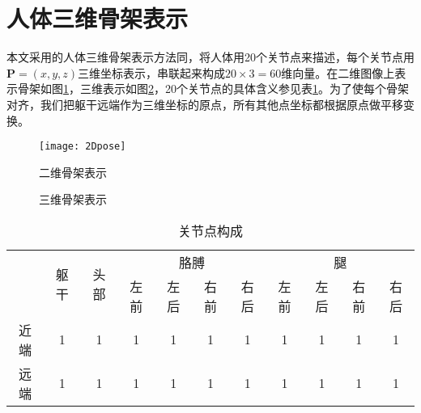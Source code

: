 \section{人体三维骨架表示}
\label{sec:skeleton}

本文采用的人体三维骨架表示方法同\cite{bo2010twin}，将人体用20个关节点来描述，每个关节点用$\mathbf{P}=(x,y,z)$三维坐标表示，串联起来构成$20\times3=60$维向量。在二维图像上表示骨架如图\ref{fig:2Ddemo}，三维表示如图\ref{fig:3Ddemo}，20个关节点的具体含义参见表\ref{tab:20}。为了使每个骨架对齐，我们把躯干远端作为三维坐标的原点，所有其他点坐标都根据原点做平移变换。

\begin{figure}[htbp]
  \centering
  \texttt{[image: 2Dpose]}\\
  \caption{二维骨架表示}\label{fig:2Ddemo}
\end{figure}

\begin{figure}[htbp]
  \centering
  \subcaptionbox{}{\texttt{[image: 3D\_1]}}\hspace{1cm}
  \subcaptionbox{}{\texttt{[image: 3D\_2]}}\hspace{1cm}
  \subcaptionbox{}{\texttt{[image: 3D\_3]}}
  \caption{三维骨架表示}\label{fig:3Ddemo}
\end{figure}

\begin{table}[htbp]
  \centering
  \begin{tabular}{ccccccccccc}
  \toprule[1.5pt]
    & \multirow{2}{4em}{躯干}  & \multirow{2}{4em}{头部}  & \multicolumn{4}{c}{胳膊} & \multicolumn{4}{c}{腿}\\
    & & & 左前 & 左后 & 右前 & 右后 & 左前 & 左后 & 右前 & 右后 \\\midrule[1pt]
   近端 & 1 & 1 & 1 & 1 & 1 & 1 & 1 & 1 & 1 & 1 \\
   远端 & 1 & 1 & 1 & 1 & 1 & 1 & 1 & 1 & 1 & 1 \\
   \bottomrule[1.5pt]
  \end{tabular}
  \caption{关节点构成}\label{tab:20}
\end{table}

